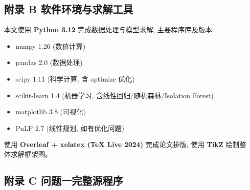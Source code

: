 \subsection*{附录 B \quad 软件环境与求解工具}

本文使用 \textbf{Python 3.12} 完成数据处理与模型求解, 主要程序库及版本:
\begin{itemize}
  \item numpy 1.26 (数值计算)
  \item pandas 2.0 (数据处理)
  \item scipy 1.11 (科学计算, 含 optimize 优化)
  \item scikit-learn 1.4 (机器学习, 含线性回归/随机森林/Isolation Forest)
  \item matplotlib 3.8 (可视化)
  \item PuLP 2.7 (线性规划, 如有优化问题)
\end{itemize}

使用 \textbf{Overleaf + xelatex (TeX Live 2024)} 完成论文排版, 使用 \textbf{TikZ} 绘制整体求解框架图。


\subsection*{附录 C \quad 问题一完整源程序}

